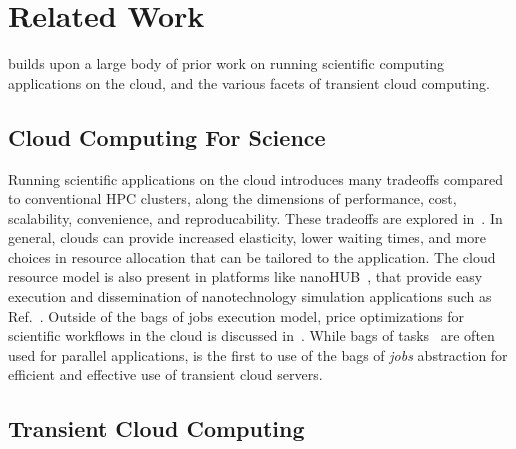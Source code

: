 \vspace*{\subsecspace}
\section{Related Work}
\label{sec:related}
\sysname builds upon a large body of prior work on running scientific computing applications on the cloud, and the various facets of transient cloud computing.  

\vspace*{\subsecspace}
\subsection{Cloud Computing For Science}
Running scientific applications on the cloud introduces many tradeoffs compared to conventional HPC clusters, along the dimensions of performance, cost, scalability, convenience, and reproducability.
These tradeoffs are explored in~\cite{iosup_performance_2011, zhai_cloud_2011, marathe2013comparative, galante_analysis_2016, benedictis_cloud-aware_2014}.
In general, clouds can provide increased elasticity, lower waiting times, and more choices in resource allocation that can be tailored to the application.
The cloud resource model is also present in platforms like nanoHUB~\cite{nanohub}, that provide easy execution and dissemination of nanotechnology simulation applications such as Ref.~\cite{kadupitiya2017}.
Outside of the bags of jobs execution model, price optimizations for scientific workflows in the cloud is discussed in~\cite{gari_learning_2019}. 
While bags of tasks~\cite{varshney_autobot_2019} are often used for parallel applications, \sysname is the first to use of the bags of \emph{jobs} abstraction for efficient and effective use of transient cloud servers. 

\vspace*{\subsecspace}
\subsection{Transient Cloud Computing}

